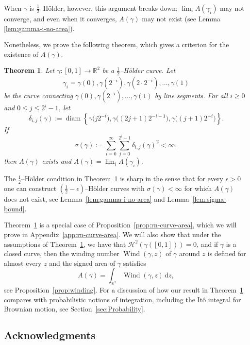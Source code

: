 \documentclass[12pt,reqno]{amsart}
\newcommand{\R}{\mathbb{R}}
\newcommand{\ud}[0]{\,\mathrm{d}}
\newcommand{\from}{\colon}
\newtheorem{thm}{Theorem}[section]
\theoremstyle{remark}
\newcommand{\0}{\mathbf{0}}
\renewcommand{\1}{\mathbf 1}
\DeclareMathOperator{\diam}{diam}
\DeclareMathOperator{\Wind}{Wind}
\begin{document}
  When $\gamma$ is $\frac{1}{2}$--Hölder, however, this argument breaks down; $\lim_i A(\gamma_i)$ may not converge, and even when it converges, $A(\gamma)$ may not exist (see Lemma \ref{lem:gamma-i-no-area}).
  
  Nonetheless, we prove the following theorem, which gives a criterion for the existence of $A(\gamma)$. 

\begin{thm}\label{thm:ExistenceAreaCurves}
Let $\gamma\from [0,1] \to \R^{2}$ be a $\frac{1}{2}$--H\"older curve.
  Let 
  $$
  \gamma_i = \overline{\gamma(0), \gamma(2^{-i}), \gamma(2\cdot 2^{-i}), \dots, \gamma(1)}
  $$
  be the curve connecting $\gamma(0), \gamma(2^{-i}), \dots, \gamma(1)$ by line segments. For all $i\geq 0$ and $0\leq j\leq 2^i-1$, let 
  $$
  \delta_{i,j}(\gamma) := \diam\left\{\gamma\big(j 2^{-i}\big), \gamma\big((2j+1) 2^{-i-1}\big), \gamma\big((j+1) 2^{-i}\big)\right\}.
  $$
  If \begin{equation}\label{eqn:CondSigmaIntro}
  \sigma(\gamma):=\sum_{i=0}^\infty \sum_{j=0}^{2^i-1} \delta_{i,j}(\gamma)^2 < \infty,
  \end{equation}
  then $A(\gamma)$ exists and $A(\gamma) = \lim_i A(\gamma_i)$.
\end{thm}
The $\frac{1}{2}$--Hölder condition in Theorem~\ref{thm:ExistenceAreaCurves} is sharp in the sense that for every $\epsilon>0$ one can construct $(\frac{1}{2}-\epsilon)$--H\"older curves with $\sigma(\gamma)<\infty$ for which $A(\gamma)$ does not exist, see Lemma~\ref{lem:gamma-i-no-area} and Lemma~\ref{lem:sigma-bound}. 

Theorem~\ref{thm:ExistenceAreaCurves} is a special case of Proposition~\ref{prop:rn-curve-area}, which we will prove in Appendix~\ref{app:rn-curve-area}. We will also show that under the assumptions of  Theorem~\ref{thm:ExistenceAreaCurves}, we have that $\mathcal{H}^2(\gamma([0,1]))=0$, and if $\gamma$ is a closed curve, then the winding number $\Wind(\gamma,z)$ of $\gamma$ around $z$ is defined for almost every $z$ and the signed area of $\gamma$ satisfies
$$
A(\gamma) = \int_{\R^2} \Wind(\gamma,z)\ud z,
$$
see Proposition~\ref{prop:winding}. For a discussion of how our result in Theorem~\ref{thm:ExistenceAreaCurves} compares with probabilistic notions of integration, including the It\^o integral for Brownian motion, see Section~\ref{sec:Probability}.

\subsection{Acknowledgments}
\end{document}
